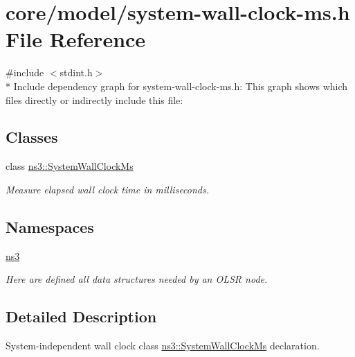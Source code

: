 \hypertarget{system-wall-clock-ms_8h}{}\section{core/model/system-\/wall-\/clock-\/ms.h File Reference}
\label{system-wall-clock-ms_8h}
{\ttfamily \#include $<$stdint.\+h$>$}\\*
Include dependency graph for system-\/wall-\/clock-\/ms.h\+:
This graph shows which files directly or indirectly include this file\+:
\subsection*{Classes}
\begin{DoxyCompactItemize}
\item 
class \hyperlink{classns3_1_1SystemWallClockMs}{ns3\+::\+System\+Wall\+Clock\+Ms}
\begin{DoxyCompactList}\small\item\em Measure elapsed wall clock time in milliseconds. \end{DoxyCompactList}\end{DoxyCompactItemize}
\subsection*{Namespaces}
\begin{DoxyCompactItemize}
\item 
 \hyperlink{namespacens3}{ns3}
\begin{DoxyCompactList}\small\item\em Here are defined all data structures needed by an O\+L\+SR node. \end{DoxyCompactList}\end{DoxyCompactItemize}


\subsection{Detailed Description}
System-\/independent wall clock class \hyperlink{classns3_1_1SystemWallClockMs}{ns3\+::\+System\+Wall\+Clock\+Ms} declaration. 